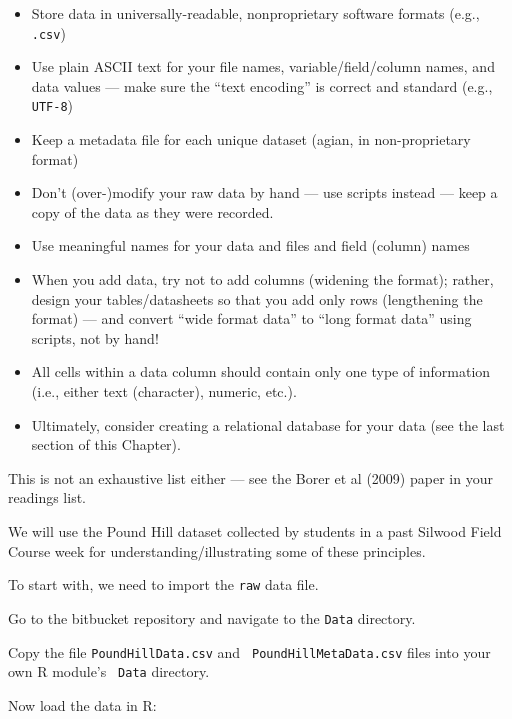 \begin{itemize}
	\item Store data in universally-readable, nonproprietary software formats (e.g., {\tt .csv})
	\item Use 
	plain ASCII text for your file names, variable/field/column names, and data 
	values --- make sure the ``text encoding'' is correct and standard 
	(e.g., {\tt UTF-8})
	\item Keep a metadata file for each unique dataset (agian, in 
	non-proprietary format)
	\item Don't (over-)modify your raw data by hand --- use scripts 
	instead --- keep a copy of the data as they were recorded.
	\item Use meaningful names for your data and files and field (column) names
	\item When you add data, try not to add columns (widening the format); rather, design your 
	tables/datasheets so that you add only rows (lengthening the format) 
	--- and convert ``wide format data'' to ``long format data'' using 
	scripts, not by hand!
	\item All cells within a data column should contain only one type of 
	information (i.e., either text (character), numeric, etc.). 
	\item Ultimately, consider creating a relational database for your 
	data (see the last section of this Chapter).
\end{itemize} 
This is not an exhaustive list either --- see the Borer et al (2009) 
paper in your readings list.

We will use the Pound Hill dataset collected by students in a past Silwood 
Field Course week for understanding/illustrating some of these 
principles. 

To start with, we need to import the {\tt raw} data file. 
\begin{compactitem}[$\quad\star$]
	\item Go to the bitbucket repository and navigate to the {\tt Data} 
	directory. 
	\item Copy the file {\tt PoundHillData.csv} and {\tt 
	PoundHillMetaData.csv} files into your own R module's {\tt
	Data} directory. 
	\item Now load the data in R: 
\end{compactitem}

